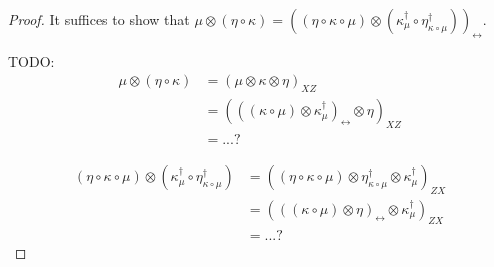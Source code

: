 \begin{proof}%
\uses{}
It suffices to show that $\mu \otimes (\eta \circ \kappa) = ((\eta \circ \kappa \circ \mu) \otimes (\kappa_{\mu}^\dagger \circ \eta_{\kappa \circ \mu}^\dagger))_\leftrightarrow$.

TODO:
\begin{align*}
\mu \otimes (\eta \circ \kappa)
&= (\mu \otimes \kappa \otimes \eta)_{XZ}
\\
&= (((\kappa \circ \mu) \otimes \kappa_\mu^\dagger)_{\leftrightarrow} \otimes \eta)_{XZ}
\\
&= ... ?
\end{align*}

\begin{align*}
(\eta \circ \kappa \circ \mu) \otimes (\kappa_{\mu}^\dagger \circ \eta_{\kappa \circ \mu}^\dagger)
&= ((\eta \circ \kappa \circ \mu) \otimes \eta_{\kappa \circ \mu}^\dagger \otimes \kappa_{\mu}^\dagger)_{ZX}
\\
&= (((\kappa \circ \mu) \otimes \eta)_\leftrightarrow \otimes \kappa_{\mu}^\dagger)_{ZX}
\\
&= ... ?
\end{align*}

\end{proof}